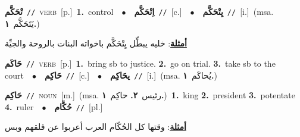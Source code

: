 \documentclass[10pt,a4paper,twoside]{article} %
\begin{document}
\begin{multicols}{2}
{\setlength\topsep{0pt}\textbf{\foreignlanguage{arabic}{تْحَكَّم}}\ {\color{gray}\texttt{//}\color{black}}\ \textsc{verb}\ [p.]\ \textbf{1.}~control\ \ $\bullet$\ \ \setlength\topsep{0pt}\textbf{\foreignlanguage{arabic}{اِتْحَكَّم}}\ {\color{gray}\texttt{//}\color{black}}\ [c.]\ \ $\bullet$\ \ \setlength\topsep{0pt}\textbf{\foreignlanguage{arabic}{يِتْحَكَّم}}\ {\color{gray}\texttt{//}\color{black}}\ [i.]\ \color{gray}(msa. \foreignlanguage{arabic}{يَتَحَكَّم}~\foreignlanguage{arabic}{\textbf{١.}})\color{black}\  \begin{flushright}\color{gray}\foreignlanguage{arabic}{\textbf{\underline{\foreignlanguage{arabic}{أمثلة}}}: خليه يبطِّل يِتْحَكَّم باخواته البنات بالروحة والجيِّة}\end{flushright}\color{black}} \vspace{2mm}

{\setlength\topsep{0pt}\textbf{\foreignlanguage{arabic}{حَاكَم}}\ {\color{gray}\texttt{//}\color{black}}\ \textsc{verb}\ [p.]\ \textbf{1.}~bring sb to justice.  \textbf{2.}~go on trial.  \textbf{3.}~take sb to the court\ \ $\bullet$\ \ \setlength\topsep{0pt}\textbf{\foreignlanguage{arabic}{حَاكِم}}\ {\color{gray}\texttt{//}\color{black}}\ [c.]\ \ $\bullet$\ \ \setlength\topsep{0pt}\textbf{\foreignlanguage{arabic}{يحَاكِم}}\ {\color{gray}\texttt{//}\color{black}}\ [i.]\ \color{gray}(msa. \foreignlanguage{arabic}{يُحاكَم}~\foreignlanguage{arabic}{\textbf{١.}})\color{black}\ } \vspace{2mm}

{\setlength\topsep{0pt}\textbf{\foreignlanguage{arabic}{حَاكِم}}\ {\color{gray}\texttt{//}\color{black}}\ \textsc{noun}\ [m.]\ \color{gray}(msa. \foreignlanguage{arabic}{رئيس}~\foreignlanguage{arabic}{\textbf{٢.}}  \foreignlanguage{arabic}{حاكِم}~\foreignlanguage{arabic}{\textbf{١.}})\color{black}\ \textbf{1.}~king  \textbf{2.}~president  \textbf{3.}~potentate  \textbf{4.}~ruler\ \ $\bullet$\ \ \setlength\topsep{0pt}\textbf{\foreignlanguage{arabic}{حُكَّام}}\ {\color{gray}\texttt{//}\color{black}}\ [pl.]\  \begin{flushright}\color{gray}\foreignlanguage{arabic}{\textbf{\underline{\foreignlanguage{arabic}{أمثلة}}}: وقتها كل الحُكّام العرب أعربوا عن قلقهم وبس}\end{flushright}\color{black}} \vspace{2mm}


\end{multicols}
\end{document}
